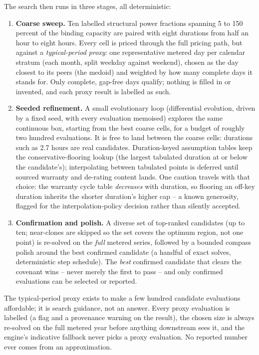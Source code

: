 The search then runs in three stages, all deterministic:

\begin{enumerate}
  \item \textbf{Coarse sweep.} Ten labelled structural power fractions spanning 5 to 150 percent of the binding capacity are paired with eight durations from half an hour to eight hours. Every cell is priced through the full pricing path, but against a \emph{typical-period proxy}: one representative metered day per calendar stratum (each month, split weekday against weekend), chosen as the day closest to its peers (the medoid) and weighted by how many complete days it stands for. Only complete, gap-free days qualify; nothing is filled in or invented, and each proxy result is labelled as such.
  \item \textbf{Seeded refinement.} A small evolutionary loop (differential evolution, driven by a fixed seed, with every evaluation memoised) explores the same continuous box, starting from the best coarse cells, for a budget of roughly two hundred evaluations. It is free to land between the coarse cells: durations such as 2.7 hours are real candidates. Duration-keyed assumption tables keep the conservative-flooring lookup (the largest tabulated duration at or below the candidate's); interpolating between tabulated points is deferred until sourced warranty and de-rating content lands. One caution travels with that choice: the warranty cycle table \emph{decreases} with duration, so flooring an off-key duration inherits the shorter duration's higher cap -- a known generosity, flagged for the interpolation-policy decision rather than silently accepted.
  \item \textbf{Confirmation and polish.} A diverse set of top-ranked candidates (up to ten; near-clones are skipped so the set covers the optimum region, not one point) is re-solved on the \emph{full} metered series, followed by a bounded compass polish around the best confirmed candidate (a handful of exact solves, deterministic step schedule). The \emph{best} confirmed candidate that clears the covenant wins -- never merely the first to pass -- and only confirmed evaluations can be selected or reported.
\end{enumerate}

\begin{caution}
The typical-period proxy exists to make a few hundred candidate evaluations affordable; it is search guidance, not an answer. Every proxy evaluation is labelled (a  flag and a provenance warning on the result), the chosen size is always re-solved on the full metered year before anything downstream sees it, and the engine's indicative fallback never picks a proxy evaluation. No reported number ever comes from an approximation.
\end{caution}

